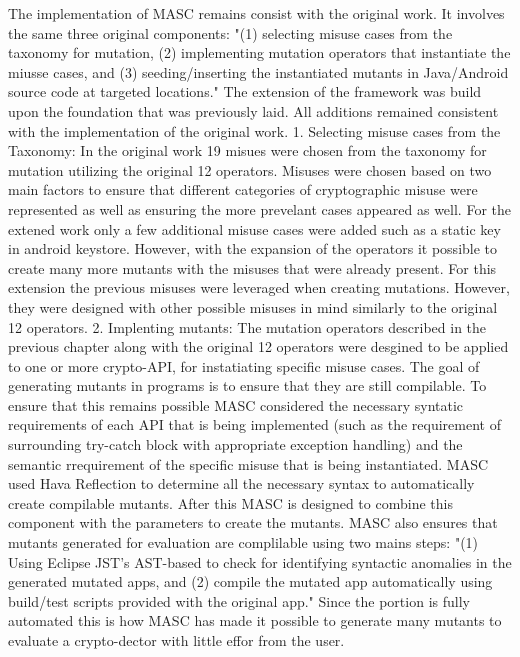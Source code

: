 The implementation of MASC remains consist with the original work. It involves the same three original components: "(1) selecting misuse cases from the taxonomy for mutation, (2) implementing mutation operators that instantiate the miusse cases, and (3) seeding/inserting the instantiated mutants in Java/Android source code at targeted locations." The extension of the framework was build upon the foundation that was previously laid. All additions remained consistent with the implementation of the original work.
1. Selecting misuse cases from the Taxonomy: In the original work 19 misues were chosen from the taxonomy for mutation utilizing the original 12 operators. Misuses were chosen based on two main factors to ensure that different categories of cryptographic misuse were represented as well as ensuring the more prevelant cases appeared as well. For the extened work only a few additional misuse cases were added such as a static key in android keystore. However, with the expansion of the operators it possible to create many more mutants with the misuses that were already present. For this extension the previous misuses were leveraged when creating mutations. However, they were designed with other possible misuses in mind similarly to the original 12 operators.
2. Implenting mutants: The mutation operators described in the previous chapter along with the original 12 operators were desgined to be applied to one or more crypto-API, for instatiating specific misuse cases. The goal of generating mutants in programs is to ensure that they are still compilable. To ensure that this remains possible MASC considered the necessary syntatic requirements of each API that is being implemented (such as the requirement of surrounding try-catch block with appropriate exception handling) and the semantic rrequirement of the specific misuse that is being instantiated. MASC used Hava Reflection to determine all the necessary syntax to automatically create compilable mutants. After this  MASC is designed to combine this component with the parameters to create the mutants.
MASC also ensures that mutants generated for evaluation are complilable using two mains steps: "(1) Using Eclipse JST's AST-based to check for identifying syntactic anomalies in the generated mutated apps, and (2) compile the mutated app automatically using build/test scripts provided with the original app." Since the portion is fully automated this is how MASC has made it possible to generate many mutants to evaluate a crypto-dector with little effor from the user.
